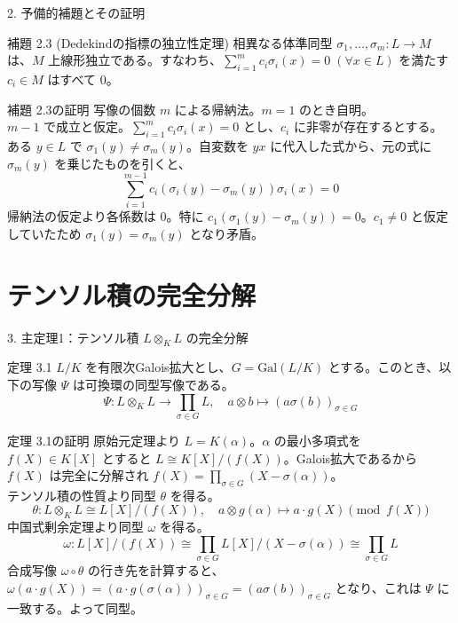 \documentclass[11pt]{beamer}
\begin{document}
\begin{frame}[allowframebreaks]{2. 予備的補題とその証明}
    \begin{block}{補題 2.3 (Dedekindの指標の独立性定理)}
        相異なる体準同型 $\sigma_1, \dots, \sigma_m: L \to M$ は、$M$ 上線形独立である。すなわち、$\sum_{i=1}^m c_i \sigma_i(x) = 0 \; (\forall x \in L)$ を満たす $c_i \in M$ はすべて $0$。
    \end{block}
    \begin{block}{補題 2.3の証明}
        写像の個数 $m$ による帰納法。$m=1$ のとき自明。\\
        $m-1$ で成立と仮定。$\sum_{i=1}^m c_i \sigma_i(x) = 0$ とし、$c_i$ に非零が存在するとする。ある $y \in L$ で $\sigma_1(y) \neq \sigma_m(y)$。自変数を $yx$ に代入した式から、元の式に $\sigma_m(y)$ を乗じたものを引くと、
        \[ \sum_{i=1}^{m-1} c_i (\sigma_i(y) - \sigma_m(y))\sigma_i(x) = 0 \]
        帰納法の仮定より各係数は $0$。特に $c_1(\sigma_1(y) - \sigma_m(y)) = 0$。$c_1 \neq 0$ と仮定していたため $\sigma_1(y) = \sigma_m(y)$ となり矛盾。
    \end{block}
\end{frame}

\section{テンソル積の完全分解}
\begin{frame}[allowframebreaks]{3. 主定理1：テンソル積 $L \otimes_K L$ の完全分解}
    \begin{block}{定理 3.1}
        $L/K$ を有限次Galois拡大とし、$G = \mathrm{Gal}(L/K)$ とする。このとき、以下の写像 $\Psi$ は可換環の同型写像である。
        \[ \Psi: L \otimes_K L \longrightarrow \prod_{\sigma \in G} L, \quad a \otimes b \longmapsto (a\sigma(b))_{\sigma \in G} \]
    \end{block}
    \begin{block}{定理 3.1の証明}
        原始元定理より $L = K(\alpha)$。$\alpha$ の最小多項式を $f(X) \in K[X]$ とすると $L \cong K[X]/(f(X))$。Galois拡大であるから $f(X)$ は完全に分解され $f(X) = \prod_{\sigma \in G} (X - \sigma(\alpha))$。\\
        テンソル積の性質より同型 $\theta$ を得る。
        \[ \theta: L \otimes_K L \cong L[X]/(f(X)), \quad a \otimes g(\alpha) \mapsto a \cdot g(X) \pmod{f(X)} \]
        中国式剰余定理より同型 $\omega$ を得る。
        \[ \omega: L[X]/(f(X)) \cong \prod_{\sigma \in G} L[X]/(X - \sigma(\alpha)) \cong \prod_{\sigma \in G} L \]
        合成写像 $\omega \circ \theta$ の行き先を計算すると、$\omega(a \cdot g(X)) = (a \cdot g(\sigma(\alpha)))_{\sigma \in G} = (a\sigma(b))_{\sigma \in G}$ となり、これは $\Psi$ に一致する。よって同型。
    \end{block}
\end{frame}
\end{document}
